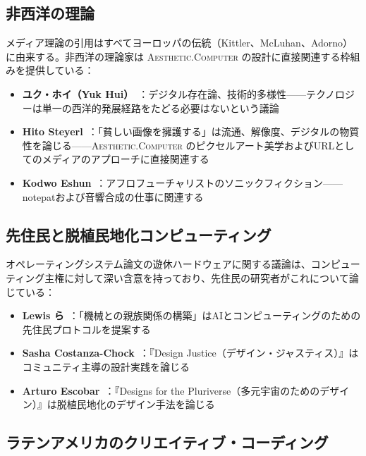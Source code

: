 \documentclass[10pt,letterpaper,twocolumn]{article}
\newcommand{\ac}{\textsc{Aesthetic.Computer}}
\begin{document}
\subsection{非西洋の理論}

メディア理論の引用はすべてヨーロッパの伝統（Kittler、McLuhan、Adorno）に由来する。非西洋の理論家は \ac{} の設計に直接関連する枠組みを提供している：

\begin{itemize}
  \item \textbf{ユク・ホイ（Yuk Hui）}~\citep{hui2016existence, hui2019recursion}：デジタル存在論、技術的多様性——テクノロジーは単一の西洋的発展経路をたどる必要はないという議論
  \item \textbf{Hito Steyerl}~\citep{steyerl2009poor}：「貧しい画像を擁護する」は流通、解像度、デジタルの物質性を論じる——\ac{} のピクセルアート美学およびURLとしてのメディアのアプローチに直接関連する
  \item \textbf{Kodwo Eshun}~\citep{eshun1998brilliant}：アフロフューチャリストのソニックフィクション——notepatおよび音響合成の仕事に関連する
\end{itemize}

\subsection{先住民と脱植民地化コンピューティング}

オペレーティングシステム論文の遊休ハードウェアに関する議論は、コンピューティング主権に対して深い含意を持っており、先住民の研究者がこれについて論じている：

\begin{itemize}
  \item \textbf{Lewis ら}~\citep{lewis2018kin}：「機械との親族関係の構築」はAIとコンピューティングのための先住民プロトコルを提案する
  \item \textbf{Sasha Costanza-Chock}~\citep{costanza2020design}：『Design Justice（デザイン・ジャスティス）』はコミュニティ主導の設計実践を論じる
  \item \textbf{Arturo Escobar}~\citep{escobar2018designs}：『Designs for the Pluriverse（多元宇宙のためのデザイン）』は脱植民地化のデザイン手法を論じる
\end{itemize}

\subsection{ラテンアメリカのクリエイティブ・コーディング}
\end{document}
